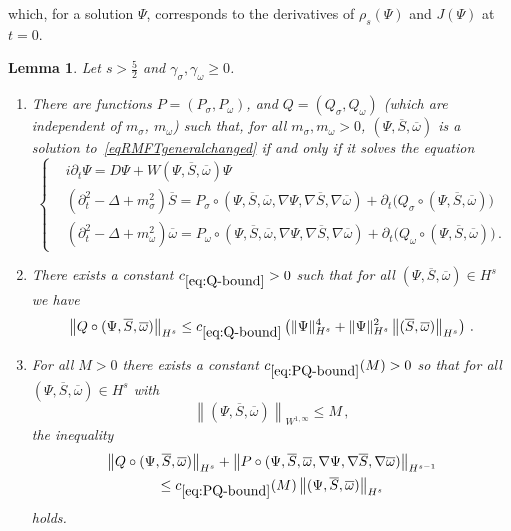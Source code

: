 \documentclass[10pt]{amsart}
\newtheorem{lemm}[theo]{Lemma}\newtheorem{prop}[theo]{Proposition}\newtheorem{coro}[theo]{Corollary}\newtheorem{conj}[theo]{Conjecture}
\theoremstyle{definition}\newtheorem{defi}[theo]{Definition}\newtheorem{rema}[theo]{Remark}\newtheorem{exam}[theo]{Example}\newtheorem{exem}[theo]{Example}\newtheorem{nota}[theo]{Notation}
\newcommand*{\romanenumi}{\renewcommand*{\theenumi}{\roman{enumi}}}
\begin{document}
which, for a solution $\Psi$, corresponds to the derivatives of $\rho_s(\Psi)$ and $J(\Psi)$ at $t=0$.

\begin{lemm}\label{lem.red-eq}
Let $s>\tfrac52$ and $\gamma_\sigma, \gamma_\omega\geq 0$.
\begin{enumerate}\romanenumi
\item There are functions $P=(P_\sigma,P_\omega)$, and $Q=(Q_\sigma, Q_\omega)$ (which are independent of $m_\sigma$, $m_\omega$) such that, for all $m_\sigma, m_\omega>0$, $(\Psi,\overline{S},\overline{\omega})$ is a solution to~\eqref{eqRMFTgeneralchanged} if and only if it solves the equation
\begin{equation}\label{eqRMFT-PQ}
\begin{cases}
&i\partial_t \Psi=D \Psi + W(\Psi, \overline{S}, \overline{\omega}) \Psi \\
&\left(\partial_t^2-\Delta + m_\sigma^2\right)\overline{S} = P_\sigma\circ (\Psi, \overline{S}, \overline{\omega}, \nabla\Psi, \nabla \overline{S}, \nabla \overline{\omega}) + \partial_t \big(Q_\sigma\circ (\Psi, \overline{S}, \overline{\omega})\big)\\
&(\partial_t^2-\Delta + m_\omega^2)\overline{\omega} = P_\omega\circ (\Psi, \overline{S}, \overline{\omega}, \nabla\Psi, \nabla \overline{S}, \nabla \overline{\omega}) + \partial_t \big(Q_\omega\circ(\Psi, \overline{S}, \overline{\omega})\big)\,.
\end{cases}
\end{equation}
\item There exists a constant $c_{\eqref{eq:Q-bound}}>0$ such that for all $(\Psi,\overline{S}, \overline{\omega})\in H^s$ we have
\begin{equation}\label{eq:Q-bound}
\left\| Q\circ(\Psi,\overline{S}, \overline{\omega})\right\|_{H^s} \leq c_{\eqref{eq:Q-bound}} \left(\|\Psi\|^4_{H^{s}} + \|\Psi\|^2_{H^{s}} \left\|(\overline{S}, \overline{\omega})\right\|_{H^s}\right)\,.
\end{equation}
\item For all $M>0$ there exists a constant $c_{\eqref{eq:PQ-bound}}(M)>0$ so that for all $(\Psi,\overline{S}, \overline{\omega})\in H^s$ with
\begin{equation*}
\left\|(\Psi,\overline{S}, \overline{\omega})\right\|_{W^{1,\infty}} \leq M\,,
\end{equation*}
the inequality
\begin{multline}\label{eq:PQ-bound}
\left\| Q \circ(\Psi,\overline{S}, \overline{\omega})\right\|_{H^s} +\left\| P\circ(\Psi, \overline{S}, \overline{\omega}, \nabla\Psi, \nabla \overline{S}, \nabla \overline{\omega})\right\|_{H^{s-1}}\\
\leq c_{\eqref{eq:PQ-bound}}(M) \left\|(\Psi,\overline{S}, \overline{\omega})\right\|_{H^{s}}
\end{multline}
holds.
\end{enumerate}
\end{lemm}
\end{document}
